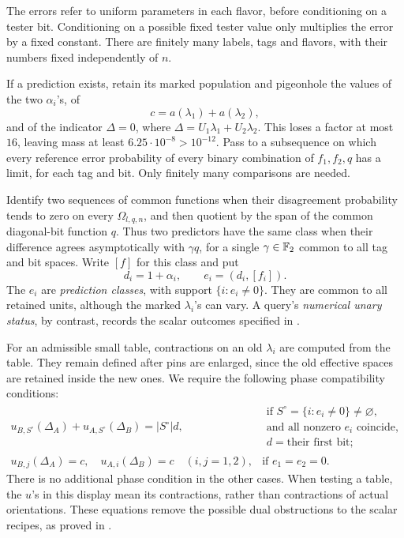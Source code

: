 The errors refer to uniform parameters in each flavor, before
conditioning on a tester bit. Conditioning on a possible fixed
tester value only multiplies the error by a fixed constant.
There are finitely many labels, tags and flavors, with their
numbers fixed independently of \(n\).

If a prediction exists, retain its marked population and
pigeonhole the values of the two \(\alpha_i\)'s, of
\[
 c=a(\lambda_1)+a(\lambda_2),
\]
and of the indicator \(\Delta=0\), where
\(\Delta=U_1\lambda_1+U_2\lambda_2\).
This loses a factor at most \(16\), leaving mass at least
\(6.25\cdot10^{-8}>10^{-12}\).
Pass to a subsequence on which every reference error probability
of every binary combination of \(f_1,f_2,q\) has a limit,
for each tag and bit. Only finitely many comparisons are needed.

Identify two sequences of common functions when their disagreement
probability tends to zero on every \(\Omega_{l,q,n}\), and then
quotient by the span of the common diagonal-bit function \(q\).
Thus two predictors have the same class when their difference
agrees asymptotically with \(\gamma q\), for a single
\(\gamma\in\mathbb F_2\) common to all tag and bit spaces.
Write \([f]\) for this class and put
\begin{equation}
 d_i=1+\alpha_i,\qquad e_i=(d_i,[f_i]).
 \label{eq:status-class}
\end{equation}
The \(e_i\) are \emph{prediction classes}, with support
\(\{i:e_i\ne0\}\). They are common to all retained units,
although the marked \(\lambda_i\)'s can vary. A query's
\emph{numerical unary status}, by contrast, records the scalar
outcomes specified in .

For an admissible small table, contractions on an old
\(\lambda_i\) are computed from the table. They remain defined
after pins are enlarged, since the old effective spaces are
retained inside the new ones. We require the following phase
compatibility conditions:
\begin{equation}
\begin{array}{ll}
\displaystyle
u_{B,S^\circ}(\Delta_A)+u_{A,S^\circ}(\Delta_B)
       =|S^\circ|d,
&
\begin{gathered}
\text{if }S^\circ=\{i:e_i\ne0\}\ne\varnothing,\\[-1mm]
\text{and all nonzero }e_i\text{ coincide},\\[-1mm]
d=\text{their first bit};
\end{gathered}
\\[4mm]
u_{B,j}(\Delta_A)=c,\quad u_{A,i}(\Delta_B)=c
\quad(i,j=1,2),
&\text{if }e_1=e_2=0.
\end{array}
\label{eq:phase-compatibility}
\end{equation}
There is no additional phase condition in the other cases.
When testing a table, the \(u\)'s in this display mean its
contractions, rather than contractions of actual orientations.
These equations remove the possible dual obstructions to the
scalar recipes, as proved in .

